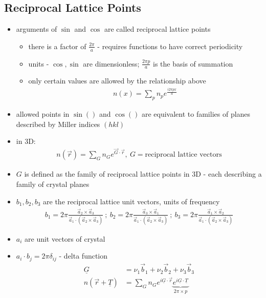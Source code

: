 \documentclass[a4paper,11pt,normalem]{article}
\begin{document}
\subsection{Reciprocal Lattice Points}

\begin{itemize}
    \item arguments of \(\sin\) and \(\cos\) are called reciprocal lattice points
        \begin{itemize}
            \item there is a factor of \(\frac{2\pi}{a}\) - requires functions to have correct periodicity
            \item units - \(\cos,\sin\) are dimensionless; \(\frac{2\pi p}{a}\) is the basis of summation
            \item only certain values are allowed by the relationship above
                \begin{align*}
                  n(x) = \sum_p n_p e^{\frac{i2\pi px}{a}}
                \end{align*}
        \end{itemize}
    \item allowed points in \(\sin()\) and \(\cos()\) are equivalent to families of planes described by Miller indices \((hkl)\)
    \item in 3D:
        \begin{align*}
            n(\vec{r}) = \sum_G n_G e^{\vec{G}\cdot\vec{r}}, ~ G = \text{reciprocal lattice vectors}
        \end{align*}
    \item \(G\) is defined as the family of reciprocal lattice points in 3D - each describing a family of crystal planes
    \item \(b_1,b_2,b_3\) are the reciprocal lattice unit vectors, units of frequency
        \begin{align*}
            b_1 = 2\pi\frac{\vec{a}_2 \times \vec{a}_3}{\vec{a}_1\cdot(\vec{a}_2 \times \vec{a}_3)} ~;~ b_2 = 2\pi\frac{\vec{a}_3 \times \vec{a}_1}{\vec{a}_1\cdot(\vec{a}_2 \times \vec{a}_3)} ~;~ b_3 = 2\pi\frac{\vec{a}_1 \times \vec{a}_2}{\vec{a}_1\cdot(\vec{a}_2 \times \vec{a}_3)}
        \end{align*}
    \item \(a_i\) are unit vectors of crystal
    \item \(a_i \cdot b_j = 2\pi\delta_{ij}\) - delta function
        \begin{align*}
            \underline{G} &= \nu_1\vec{b}_1 + \nu_2\vec{b}_2 + \nu_3\vec{b}_3 \\
            n(\vec{r} + \underline{T}) &= \sum_G n_G e^{i\underline{G}\cdot\vec{r}}\underbrace{e^{i\underline{G}\cdot\underline{T}}}_{2\pi \times p}
        \end{align*}
\end{itemize}
\end{document}
